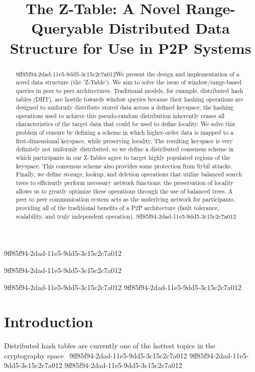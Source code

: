 \documentclass[12pt]{article}
\title{The Z-Table: A Novel Range-Queryable Distributed Data Structure for Use in P2P Systems}
\begin{document}
\maketitle
9ff85f94-2dad-11e5-9dd5-3c15c2c7a012
\begin{abstract}
9ff85f94-2dad-11e5-9dd5-3c15c2c7a012We present the design and implementation of a novel data structure (the 'Z-Table'). We aim to solve the issue of window/range-based queries in peer to peer architectures. Traditional models, for example,  distributed hash tables (DHT), are hostile towards window queries because their hashing operations are designed to uniformly distribute stored data across a defined keyspace; the hashing operations used to achieve this pseudo-random distribution inherently erases all characteristics of the target data that could be used to define locality. We solve this problem of erasure by defining a scheme in which higher-order data is mapped to a first-dimensional keyspace, while preserving locality. The resulting keyspace is very definitely not uniformly distributed, so we define a distributed consensus scheme in which participants in our Z-Tables agree to target highly populated regions of the keyspace. This consensus scheme also provides some protection from Sybil attacks. Finally, we define storage, lookup, and deletion operations that utilize balanced search trees to efficiently perform necessary network functions; the preservation of locality allows us to greatly optimize these operations through the use of balanced trees. A peer to peer communication system acts as the underlying network for participants, providing all of the traditional benefits of a P2P architecture (fault tolerance, scalability, and truly independent operation).
9ff85f94-2dad-11e5-9dd5-3c15c2c7a012\end{abstract}
9ff85f94-2dad-11e5-9dd5-3c15c2c7a012

9ff85f94-2dad-11e5-9dd5-3c15c2c7a012\newpage
9ff85f94-2dad-11e5-9dd5-3c15c2c7a012\section{Introduction}
Distributed hash tables are currently one of the hottest topics in the cryptography space~\cite{Stoica:2001dj,Rowstron:2001ea,Ratnasamy:2001wn}
9ff85f94-2dad-11e5-9dd5-3c15c2c7a012
9ff85f94-2dad-11e5-9dd5-3c15c2c7a012\printbibliography
9ff85f94-2dad-11e5-9dd5-3c15c2c7a012
\end{document}
